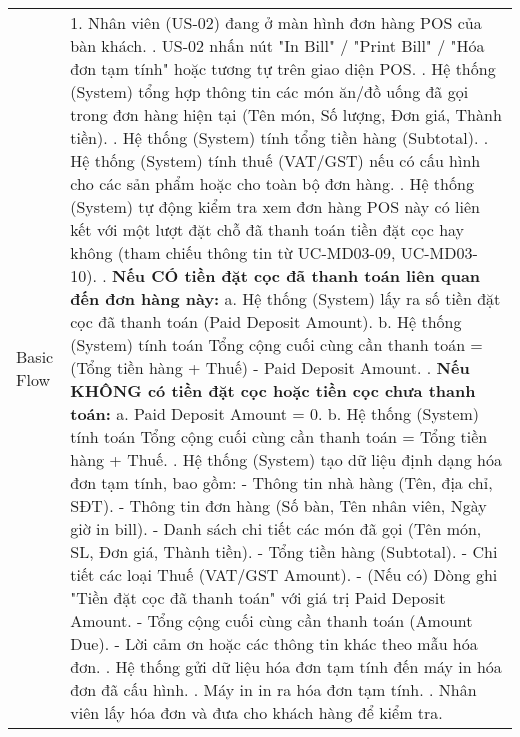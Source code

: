 \begin{longtable}{|m{4cm}|p{11cm}|}
Basic Flow & 1. Nhân viên (US-02) đang ở màn hình đơn hàng POS của bàn khách. \newline 2. US-02 nhấn nút "In Bill" / "Print Bill" / "Hóa đơn tạm tính" hoặc tương tự trên giao diện POS. \newline 3. Hệ thống (System) tổng hợp thông tin các món ăn/đồ uống đã gọi trong đơn hàng hiện tại (Tên món, Số lượng, Đơn giá, Thành tiền). \newline 4. Hệ thống (System) tính tổng tiền hàng (Subtotal). \newline 5. Hệ thống (System) tính thuế (VAT/GST) nếu có cấu hình cho các sản phẩm hoặc cho toàn bộ đơn hàng. \newline 6. Hệ thống (System) tự động kiểm tra xem đơn hàng POS này có liên kết với một lượt đặt chỗ đã thanh toán tiền đặt cọc hay không (tham chiếu thông tin từ UC-MD03-09, UC-MD03-10). \newline 7. \textbf{Nếu CÓ tiền đặt cọc đã thanh toán liên quan đến đơn hàng này:} \newline    a. Hệ thống (System) lấy ra số tiền đặt cọc đã thanh toán (Paid Deposit Amount). \newline    b. Hệ thống (System) tính toán Tổng cộng cuối cùng cần thanh toán = (Tổng tiền hàng + Thuế) - Paid Deposit Amount. \newline 8. \textbf{Nếu KHÔNG có tiền đặt cọc hoặc tiền cọc chưa thanh toán:} \newline    a. Paid Deposit Amount = 0. \newline    b. Hệ thống (System) tính toán Tổng cộng cuối cùng cần thanh toán = Tổng tiền hàng + Thuế. \newline 9. Hệ thống (System) tạo dữ liệu định dạng hóa đơn tạm tính, bao gồm: \newline    - Thông tin nhà hàng (Tên, địa chỉ, SĐT). \newline    - Thông tin đơn hàng (Số bàn, Tên nhân viên, Ngày giờ in bill). \newline    - Danh sách chi tiết các món đã gọi (Tên món, SL, Đơn giá, Thành tiền). \newline    - Tổng tiền hàng (Subtotal). \newline    - Chi tiết các loại Thuế (VAT/GST Amount). \newline    - (Nếu có) Dòng ghi "Tiền đặt cọc đã thanh toán" với giá trị Paid Deposit Amount. \newline    - Tổng cộng cuối cùng cần thanh toán (Amount Due). \newline    - Lời cảm ơn hoặc các thông tin khác theo mẫu hóa đơn. \newline 10. Hệ thống gửi dữ liệu hóa đơn tạm tính đến máy in hóa đơn đã cấu hình. \newline 11. Máy in in ra hóa đơn tạm tính. \newline 12. Nhân viên lấy hóa đơn và đưa cho khách hàng để kiểm tra. \\

\end{longtable}
